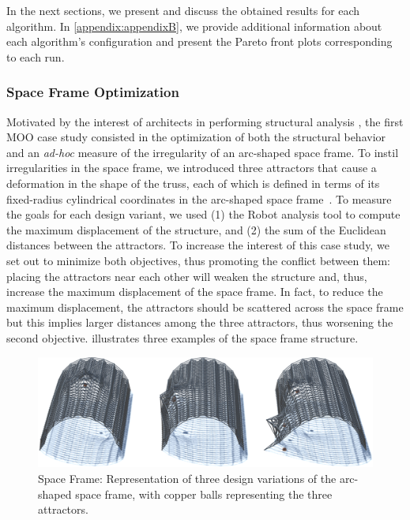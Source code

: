 In the next sections, we present and discuss the obtained results for each algorithm. In \cref{appendix:appendixB}, we provide additional information about each algorithm's configuration and present the Pareto front plots corresponding to each run.

\subsubsection{Space Frame Optimization}
Motivated by the interest of architects in performing structural analysis \cite{Cichocka2017SURVEY}, the first \ac{MOO} case study consisted in the optimization of both the structural behavior and an \textit{ad-hoc} measure of the irregularity of an arc-shaped space frame. To instil irregularities in the space frame, we introduced three attractors that cause a deformation in the shape of the truss, each of which is defined in terms of its fixed-radius cylindrical coordinates in the arc-shaped space frame~\cite{Belem2019MOO}. To measure the goals for each design variant, we used (1) the Robot analysis tool to compute the maximum displacement of the structure, and (2) the sum of the Euclidean distances between the attractors. To increase the interest of this case study, we set out to minimize both objectives, thus promoting the conflict between them: placing the attractors near each other will weaken the structure and, thus, increase the maximum displacement of the space frame. In fact, to reduce the maximum displacement, the attractors should be scattered across the space frame but this implies larger distances among the three attractors, thus worsening the second objective.  illustrates three examples of the space frame structure. 
\begin{figure}[htbp]
	\centering
	\includegraphics[width=1\textwidth]{Images/Evaluation/truss-kat-small.png}
	\caption[Space Frame: Representation of three space frame design variants]{Space Frame: Representation of three design variations of the arc-shaped space frame, with copper balls representing the three attractors.}
	\label{fig:spaceframe}
\end{figure}

